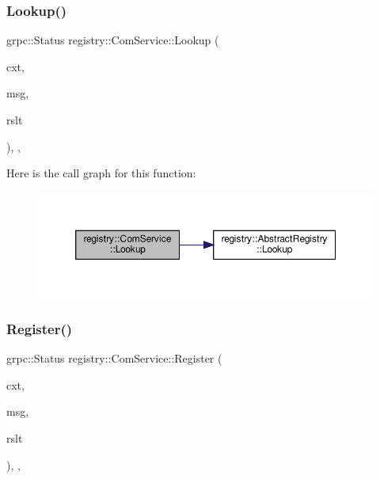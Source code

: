 \mbox{\label{classregistry_1_1ComService_a06ba4b402944f87dbce6c2ce37d8c279}} 
\subsubsection{\texorpdfstring{Lookup()}{Lookup()}}
{\footnotesize\ttfamily grpc\+::\+Status registry\+::\+Com\+Service\+::\+Lookup (\begin{DoxyParamCaption}\item[{grpc\+::\+Server\+Context $\ast$}]{cxt,  }\item[{Com\+Msg const $\ast$}]{msg,  }\item[{Result $\ast$}]{rslt }\end{DoxyParamCaption})\hspace{0.3cm}{\ttfamily [inline]}, {\ttfamily [override]}, {\ttfamily [private]}}

Here is the call graph for this function\+:\nopagebreak
\begin{figure}[H]
\begin{center}
\leavevmode
\includegraphics[width=350pt]{classregistry_1_1ComService_a06ba4b402944f87dbce6c2ce37d8c279_cgraph}
\end{center}
\end{figure}
\mbox{\label{classregistry_1_1ComService_aae8b56b86316397140c4f1cc4824410a}} 
\subsubsection{\texorpdfstring{Register()}{Register()}}
{\footnotesize\ttfamily grpc\+::\+Status registry\+::\+Com\+Service\+::\+Register (\begin{DoxyParamCaption}\item[{grpc\+::\+Server\+Context $\ast$}]{cxt,  }\item[{Com\+Msg const $\ast$}]{msg,  }\item[{Result $\ast$}]{rslt }\end{DoxyParamCaption})\hspace{0.3cm}{\ttfamily [inline]}, {\ttfamily [override]}, {\ttfamily [private]}}

